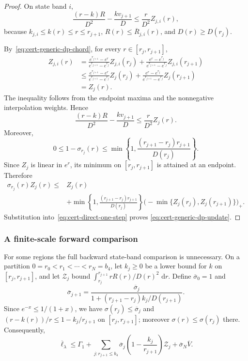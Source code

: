 \documentclass[11pt]{article}
\theoremstyle{definition}
\theoremstyle{remark}
\newcommand{\dd}{\,\mathrm d}
\begin{document}
\begin{proof}
On state band $i$,
\[
 \frac{(r-k)R}{D^2}
 -\frac{kv_{j+1}}{D}
 \le
 \frac r{D^2}Z_{j,i}(r),
\]
because $k_{j,i}\le k(r)\le r\le r_{j+1}$,
$R(r)\le\overline R_{j,i}(r)$, and
$D(r)\ge D(r_j)$.

By~\eqref{eq:cert-generic-dp-chord}, for every
$r\in[r_j,r_{j+1}]$,
\begin{align*}
 Z_{j,i}(r)
 &=\frac{e^{r_{j+1}}-e^r}{e^{r_{j+1}}-e^{r_j}}Z_{j,i}(r_j)
 +\frac{e^r-e^{r_j}}{e^{r_{j+1}}-e^{r_j}}Z_{j,i}(r_{j+1})\\
 &\le\frac{e^{r_{j+1}}-e^r}{e^{r_{j+1}}-e^{r_j}}Z_j(r_j)
 +\frac{e^r-e^{r_j}}{e^{r_{j+1}}-e^{r_j}}Z_j(r_{j+1})\\
 &=Z_j(r).
\end{align*}
The inequality follows from the endpoint maxima and the nonnegative
interpolation weights.
Hence
\[
 \frac{(r-k)R}{D^2}
 -\frac{kv_{j+1}}{D}
 \le
 \frac r{D^2}Z_j(r).
\]
Moreover,
\[
 0\le1-\sigma_{r_j}(r)
 \le
 \min\left\{
 1,\frac{(r_{j+1}-r_j)r_{j+1}}{D(r_j)}
 \right\}.
\]
Since $Z_j$ is linear in $e^r$, its minimum on
$[r_j,r_{j+1}]$ is attained at an endpoint.  Therefore
\begin{align*}
 \sigma_{r_j}(r)Z_j(r)
 \le{}&
 Z_j(r)\\
 &+
 \min\left\{
 1,\frac{(r_{j+1}-r_j)r_{j+1}}{D(r_j)}
 \right\}
 \bigl(-\min\{Z_j(r_j),Z_j(r_{j+1})\}\bigr)_+ .
\end{align*}
Substitution into~\eqref{eq:cert-direct-one-step} proves
\eqref{eq:cert-generic-dp-update}.
\end{proof}

\subsubsection{A finite-scale forward comparison}

For some regions the full backward state-band comparison is unnecessary.
On a partition $0=r_0<r_1<\cdots<r_N=b_4$,
let $k_j\ge0$ be a lower bound for $k$ on $[r_j,r_{j+1}]$, and let
$\mathcal Z_j$ bound $\int_{r_j}^{r_{j+1}}rR(r)/D(r)^2\,\dd r$.  Define
$\overline \sigma_0=1$ and
\[
 \overline \sigma_{j+1}
 =
 \frac{\overline \sigma_j}
 {1+(r_{j+1}-r_j)k_j/D(r_{j+1})}.
\]
Since $e^{-x}\le1/(1+x)$, we have
$\sigma(r_j)\le\overline \sigma_j$ and
$(r-k(r))/r\le1-k_j/r_{j+1}$ on $[r_j,r_{j+1}]$; moreover $\sigma(r)\le\sigma(r_j)$ there.  Consequently,
\begin{equation}\label{eq:cert-forward-bound}
 \overline\ell_\lambda\le\Gamma_1+
 \sum_{j:r_{j+1}\le b_4}
 \overline \sigma_j
 \left(1-\frac{k_j}{r_{j+1}}\right)\mathcal Z_j
 +\overline \sigma_N\overline V.
\end{equation}
\end{document}
